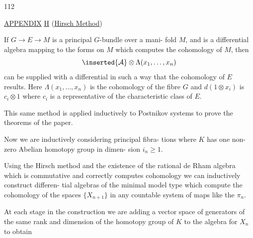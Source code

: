\begin{flushright}112\end{flushright}
\begin{center}\uline{APPENDIX} \uline{H} (\uline{Hirsch Method})\end{center}

If $G\to E\to M$ is a principal $G$-bundle over a mani-
fold $M$, and  is a differential algebra mapping to the
forms on $M$ which computes the cohomology of $M$, then
\[
\inserted{\mathcal A}\otimes\Lambda(x_1,\ldots,x_n)
\]
can be supplied with a differential in such a way that
the cohomology of $E$ results. Here $\Lambda(x_1,\ldots,x_n)$ is the
cohomology of the fibre $G$ and $d(1\otimes x_i)$ is $c_i\otimes1$ where $c_i$ is
a representative of the characteristic class of $E$.

This same method is applied inductively to Postnikov
systems to prove the theorems of the paper.

Now we are inductively considering principal fibra-
tions
where $K$ has one non-zero Abelian homotopy group in dimen-
sion $i_n\geq1$.

Using the Hirsch method and the existence of the
rational de Rham algebra which is commutative and correctly
computes cohomology we can inductively construct differen-
tial algebras of the minimal model type which compute
the cohomology of the spaces $\{X_{n+1}\}$ in any countable
system of maps like the $\pi_n$.

At each stage in the construction we are adding a
vector space of generators of the same rank and dimension
of the homotopy group of $K$ to the algebra for $X_n$ to obtain
